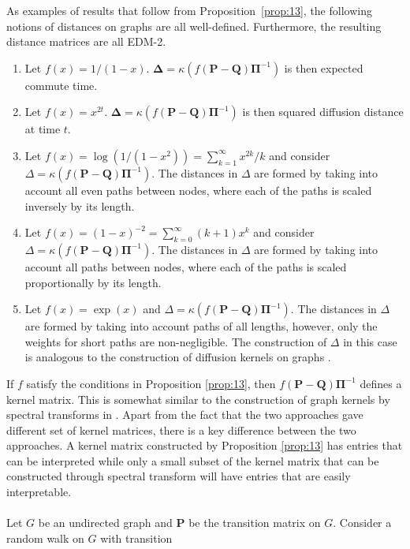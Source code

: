 \documentclass[10pt,twocolumn]{article}
\numberwithin{equation}{section}
\begin{document}
As examples of results that follow from Proposition~\ref{prop:13}, the
following notions of distances on graphs are all
well-defined. Furthermore, the resulting distance matrices are all
EDM-2.
\begin{enumerate}
\item Let $f(x) = 1/(1-x)$. $\bm{\Delta} = \kappa(f(\mathbf{P} -
  \mathbf{Q})\bm{\Pi}^{-1})$ is then expected commute time.
\item Let $f(x) = x^{2t}$. $\bm{\Delta} = \kappa(f(\mathbf{P} -
  \mathbf{Q})\bm{\Pi}^{-1})$ is then squared diffusion distance at
  time $t$. 
\item Let $f(x) = \log(1/(1-x^2)) = \sum_{k=1}^{\infty}{x^{2k}/k}$ and
  consider $\Delta = \kappa(f(\mathbf{P} -
  \mathbf{Q})\bm{\Pi}^{-1})$. The distances in $\Delta$ are formed by
  taking into account all even paths between nodes, where each of the
  paths is scaled inversely by its length.
\item Let $f(x) = (1-x)^{-2} = \sum_{k=0}^{\infty}{(k+1)x^k}$ and
  consider $\Delta = \kappa(f(\mathbf{P} -
  \mathbf{Q})\bm{\Pi}^{-1})$. The distances in $\Delta$ are formed by
  taking into account all paths between nodes, where each of the paths
  is scaled proportionally by its length.
\item Let $f(x) = \exp(x)$ and $\Delta = \kappa(f(\mathbf{P}
  - \mathbf{Q})\bm{\Pi}^{-1})$. The distances in $\Delta$ are formed by
  taking into account paths of all lengths, however, only the weights for
  short paths are non-negligible. The construction of $\Delta$ in this
  case is analogous to the construction of diffusion
  kernels on graphs \cite{kondor02:_diffus}. 
\end{enumerate}
%
%
If $f$ satisfy the conditions in Proposition \ref{prop:13}, then
$f(\mathbf{P} - \mathbf{Q})\bm{\Pi}^{-1}$ defines a kernel
matrix. This is somewhat similar to the construction of graph kernels
by spectral transforms in
\cite{zhu05:_semi,chapelle03:_clust_kernel_semi_super_learn,smola03:_kernel}.
Apart from the fact that the two approaches gave different set of
kernel matrices, there is a key difference between the two
approaches. A kernel matrix constructed by Proposition \ref{prop:13}
has entries that can be interpreted while only a small subset of the
kernel matrix that can be constructed through spectral transform will
have entries that are easily interpretable. \\ \\
\noindent
Let $G$ be an undirected graph and $\mathbf{P}$ be the transition
matrix on $G$. Consider a random walk on $G$ with transition
\end{document}
